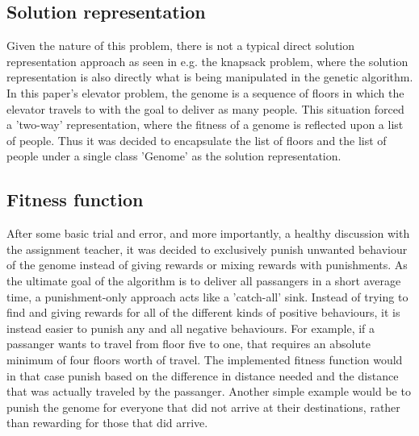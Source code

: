 \subsection{Solution representation}

Given the nature of this problem, there is not a typical direct solution representation approach as seen in e.g. the knapsack problem, where the solution representation is also directly what is being manipulated in the genetic algorithm. In this paper's elevator problem, the genome is a sequence of floors in which the elevator travels to with the goal to deliver as many people. This situation forced a 'two-way' representation, where the fitness of a genome is reflected upon a list of people. Thus it was decided to encapsulate the list of floors and the list of people under a single class 'Genome' as the solution representation.

\subsection{Fitness function}
\label{subsec:fitness_function}

After some basic trial and error, and more importantly, a healthy discussion with the assignment teacher, it was decided to exclusively punish unwanted behaviour of the genome instead of giving rewards or mixing rewards with punishments. As the ultimate goal of the algorithm is to deliver all passangers in a short average time, a punishment-only approach acts like a 'catch-all' sink. Instead of trying to find and giving rewards for all of the different kinds of positive behaviours, it is instead easier to punish any and all negative behaviours. For example, if a passanger wants to travel from floor five to one, that requires an absolute minimum of four floors worth of travel. The implemented fitness function would in that case punish based on the difference in distance needed and the distance that was actually traveled by the passanger. Another simple example would be to punish the genome for everyone that did not arrive at their destinations, rather than rewarding for those that did arrive.





